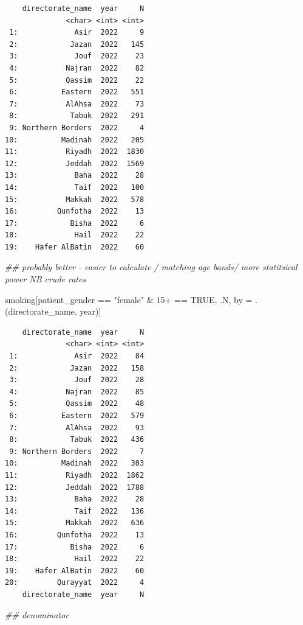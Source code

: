 \documentclass[
  letterpaper,
  DIV=11,
  numbers=noendperiod]{scrreprt}
\newenvironment{Shaded}{\begin{snugshade}}{\end{snugshade}}
\newcommand{\AttributeTok}[1]{\textcolor[rgb]{0.40,0.45,0.13}{#1}}
\newcommand{\ConstantTok}[1]{\textcolor[rgb]{0.56,0.35,0.01}{#1}}
\newcommand{\DocumentationTok}[1]{\textcolor[rgb]{0.37,0.37,0.37}{\textit{#1}}}
\newcommand{\NormalTok}[1]{\textcolor[rgb]{0.00,0.23,0.31}{#1}}
\newcommand{\OtherTok}[1]{\textcolor[rgb]{0.00,0.23,0.31}{#1}}
\newcommand{\SpecialCharTok}[1]{\textcolor[rgb]{0.37,0.37,0.37}{#1}}
\newcommand{\StringTok}[1]{\textcolor[rgb]{0.13,0.47,0.30}{#1}}
\begin{document}
\begin{verbatim}
    directorate_name  year     N
              <char> <int> <int>
 1:             Asir  2022     9
 2:            Jazan  2022   145
 3:             Jouf  2022    23
 4:           Najran  2022    82
 5:           Qassim  2022    22
 6:          Eastern  2022   551
 7:           AlAhsa  2022    73
 8:            Tabuk  2022   291
 9: Northern Borders  2022     4
10:          Madinah  2022   205
11:           Riyadh  2022  1830
12:           Jeddah  2022  1569
13:             Baha  2022    28
14:             Taif  2022   100
15:           Makkah  2022   578
16:         Qunfotha  2022    13
17:            Bisha  2022     6
18:             Hail  2022    22
19:    Hafer AlBatin  2022    60
\end{verbatim}

\begin{Shaded}
\begin{Highlighting}[]
\DocumentationTok{\#\# probably better {-} easier to calculate / matching age bands/ more statitsical power NB crude rates}

\NormalTok{smoking[patient\_gender }\SpecialCharTok{==} \StringTok{"female"} \SpecialCharTok{\&} \StringTok{\textasciigrave{}}\AttributeTok{15+}\StringTok{\textasciigrave{}} \SpecialCharTok{==} \ConstantTok{TRUE}\NormalTok{, .N, by }\OtherTok{=}\NormalTok{ .(directorate\_name, year)]}
\end{Highlighting}
\end{Shaded}

\begin{verbatim}
    directorate_name  year     N
              <char> <int> <int>
 1:             Asir  2022    84
 2:            Jazan  2022   158
 3:             Jouf  2022    28
 4:           Najran  2022    85
 5:           Qassim  2022    48
 6:          Eastern  2022   579
 7:           AlAhsa  2022    93
 8:            Tabuk  2022   436
 9: Northern Borders  2022     7
10:          Madinah  2022   303
11:           Riyadh  2022  1862
12:           Jeddah  2022  1788
13:             Baha  2022    28
14:             Taif  2022   136
15:           Makkah  2022   636
16:         Qunfotha  2022    13
17:            Bisha  2022     6
18:             Hail  2022    22
19:    Hafer AlBatin  2022    60
20:         Qurayyat  2022     4
    directorate_name  year     N
\end{verbatim}

\begin{Shaded}
\begin{Highlighting}[]
\DocumentationTok{\#\# denominator}
\end{Highlighting}
\end{Shaded}
\end{document}
